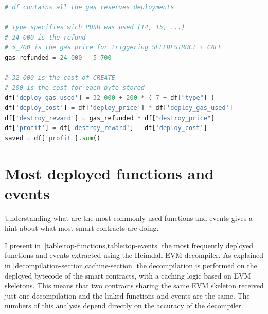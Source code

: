 \begin{lstlisting}[language=Python,label={lst:gas-calc},caption={Code for computing the total Eth saved with the GasToken pattern.},captionpos=b]
# df contains all the gas reserves deployments 

# Type specifies wich PUSH was used (14, 15, ...)
# 24_000 is the refund
# 5_700 is the gas price for triggering SELFDESTRUCT + CALL
gas_refunded = 24_000 - 5_700 

# 32_000 is the cost of CREATE
# 200 is the cost for each byte stored
df['deploy_gas_used'] = 32_000 + 200 * ( 7 + df["type"] )
df['deploy_cost'] = df['deploy_price'] * df['deploy_gas_used']
df['destroy_reward'] = gas_refunded * df["destroy_price"]
df['profit'] = df['destroy_reward'] - df['deploy_cost']
saved = df['profit'].sum()
\end{lstlisting}

\newpage

\section{Most deployed functions and events}

Understanding what are the most commonly used functions and events gives a hint about what most smart contracts are doing.

I present in~\cref{table:top-functions,table:top-events} the most frequently deployed functions and events extracted using the Heimdall EVM decompiler. As explained in \cref{decompilation-section,cachine-section} the decompilation is performed on the deployed bytecode of the smart contracts, with a caching logic based on EVM skeletons. This means that two contracts sharing the same EVM skeleton received just one decompilation and the linked functions and events are the same. The numbers of this analysis depend directly on the accuracy of the decompiler.

